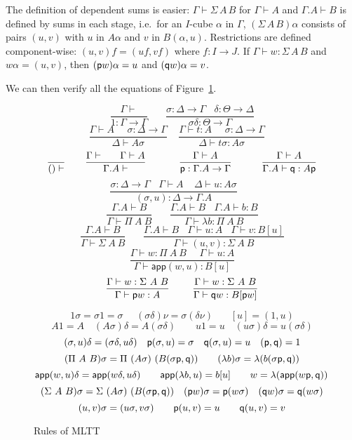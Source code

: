 \documentclass[10pt,a4paper]{article}
\newcommand{\app}{\mathsf{app}}
\newcommand{\pp}{{\sf p}}
\newcommand{\qq}{{\sf q}}
\begin{document}
The definition of dependent sums is easier: $\Gamma\vdash\Sigma\,A\,B$
for $\Gamma \vdash A$ and $\Gamma.A \vdash B$ is defined by sums in
each stage, i.e.\ for an $I$-cube $\alpha$ in $\Gamma$,
$(\Sigma\,A\,B)\alpha$ consists of pairs $(u,v)$ with $u$ in $A
\alpha$ and $v$ in $B (\alpha, u)$.  Restrictions are defined
component-wise: $(u,v)f = (u f, v f)$ where $f \colon I \to J$.  If
$\Gamma \vdash w : \Sigma\,A\,B$ and $w \alpha = (u,v)$, then $(\pp w)
\alpha = u$ and $(\qq w) \alpha = v$.

We can then verify all the equations of Figure~\ref{MLTT}.
\begin{figure}[t]
\caption{Rules of MLTT\label{MLTT}}
\centering
$$
\frac{\Gamma\vdash}{1:\Gamma\to \Gamma}~~~~~~~~
\frac{\sigma:\Delta\to\Gamma~~~~\delta:\Theta\to\Delta}
     {\sigma\delta:\Theta\to\Gamma}
$$
$$
\frac{\Gamma\vdash A~~~~~~\sigma:\Delta\to\Gamma}{\Delta\vdash A\sigma}~~~~~
\frac{\Gamma\vdash t:A~~~~~~\sigma:\Delta\to\Gamma}{\Delta\vdash t\sigma:A\sigma}~~~~~
$$
$$
\frac{}{()\vdash}~~~~~~
\frac{\Gamma\vdash~~~~~\Gamma\vdash A}{\Gamma.A\vdash}~~~~~~~~~~
\frac{\Gamma\vdash A}{\pp:\Gamma.A\to\Gamma}~~~~~~~~~
\frac{\Gamma\vdash A}{\Gamma.A\vdash \qq:A\pp}
$$
$$
\frac{\sigma:\Delta\to\Gamma~~~~\Gamma\vdash A~~~~~\Delta\vdash u:A\sigma}
     {(\sigma,u):\Delta\to\Gamma.A}~~~~~~~~
$$
$$
\frac{\Gamma.A\vdash B}{\Gamma\vdash\Pi~A~B}~~~~~~~~
\frac{\Gamma.A\vdash B~~~~\Gamma.A\vdash b:B}
     {\Gamma\vdash\lambda b:\Pi~A~B}
$$
$$
\frac{\Gamma.A\vdash B}{\Gamma\vdash\Sigma~A~B}~~~~~~~~
\frac{\Gamma.A\vdash B~~~~\Gamma\vdash u:A~~~~\Gamma\vdash v:B[u]}
     {\Gamma\vdash (u,v):\Sigma~A~B}
$$
$$
\frac{\Gamma\vdash w:\Pi~A~B~~~~~~\Gamma\vdash u:A}
     {\Gamma\vdash \app(w,u):B[u]}
$$
$$
\frac{\Gamma\vdash w:\Sigma~A~B}{\Gamma\vdash \pp w : A}~~~~~~~
\frac{\Gamma\vdash w:\Sigma~A~B}{\Gamma\vdash \qq w : B[\pp w]}
$$


\medskip

$$
{1\sigma = \sigma 1 = \sigma}~~~~~~{(\sigma\delta)\nu = \sigma(\delta\nu)}~~~~~~~~[u] = (1,u)
$$
$$
{A 1 = A \quad (A \sigma) \delta = A (\sigma \delta) \qquad  u 1 = u \quad
(u \sigma) \delta = u (\sigma \delta)}
$$
$$
{(\sigma,u)\delta = (\sigma\delta,u\delta)} \quad {\pp (\sigma,u) =
  \sigma} \quad {\qq(\sigma,u) = u} \quad (\pp, \qq) = 1
$$
$$
{(\Pi~A~B)\sigma = \Pi~(A\sigma)~(B(\sigma\pp,\qq))} \qquad
{(\lambda b) \sigma = \lambda (b (\sigma \pp, \qq))}
$$
$$
     {\app(w,u)\delta= \app(w\delta,u\delta)}\qquad
     {\app(\lambda b,u)= b[u]}\qquad
     {w = \lambda (\app(w \pp, \qq))} \qquad
$$
$$
(\Sigma~A~B)\sigma = \Sigma~(A\sigma)~(B(\sigma\pp,\qq)) \quad (\pp w)
\sigma = \pp (w \sigma) \quad (\qq w) \sigma = \qq (w \sigma)
$$
$$
(u, v) \sigma = (u \sigma, v \sigma) \qquad\pp (u,v) = u \qquad \qq
(u,v) = v
$$
\end{figure}
\end{document}
